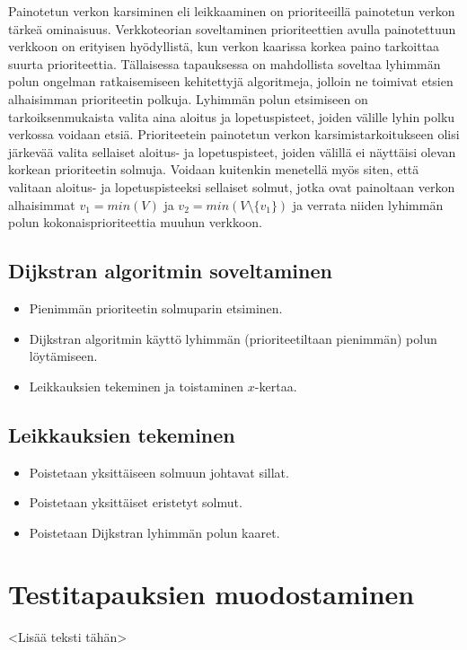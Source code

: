 Painotetun verkon karsiminen eli leikkaaminen on prioriteeillä painotetun verkon tärkeä ominaisuus.
Verkkoteorian soveltaminen prioriteettien avulla painotettuun verkkoon on erityisen hyödyllistä, kun verkon kaarissa korkea paino tarkoittaa suurta prioriteettia.
Tällaisessa tapauksessa on mahdollista soveltaa lyhimmän polun ongelman ratkaisemiseen kehitettyjä algoritmeja, jolloin ne toimivat etsien alhaisimman prioriteetin polkuja.
Lyhimmän polun etsimiseen on tarkoiksenmukaista valita aina aloitus ja lopetuspisteet, joiden välille lyhin polku verkossa voidaan etsiä.
Prioriteetein painotetun verkon karsimistarkoitukseen olisi järkevää valita sellaiset aloitus- ja lopetuspisteet, joiden välillä ei näyttäisi olevan korkean prioriteetin solmuja.
Voidaan kuitenkin menetellä myös siten, että valitaan aloitus- ja lopetuspisteeksi sellaiset solmut, jotka ovat painoltaan verkon alhaisimmat \(v_1 = min(V)\) ja \(v_2 = min(V \setminus \{v_1\})\) ja verrata niiden lyhimmän polun kokonaisprioriteettia muuhun verkkoon.

  \subsection{Dijkstran algoritmin soveltaminen}

  \begin{itemize}
    \item Pienimmän prioriteetin solmuparin etsiminen.
    \item Dijkstran algoritmin käyttö lyhimmän (prioriteetiltaan pienimmän) polun löytämiseen.
    \item Leikkauksien tekeminen ja toistaminen \(x\)-kertaa.
  \end{itemize}

  \subsection{Leikkauksien tekeminen}

  \begin{itemize}
    \item Poistetaan yksittäiseen solmuun johtavat sillat.
    \item Poistetaan yksittäiset eristetyt solmut.
    \item Poistetaan Dijkstran lyhimmän polun kaaret.
  \end{itemize}

\section{Testitapauksien muodostaminen}

<Lisää teksti tähän>
